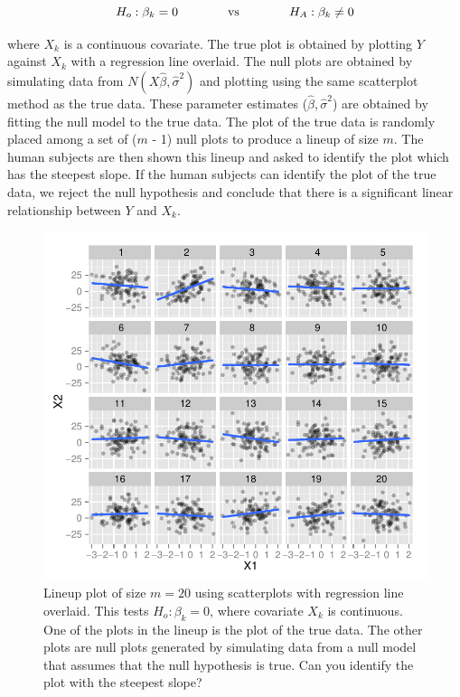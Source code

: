 \documentclass[12]{article}
\begin{document}
$$H_o : \beta_k = 0 \qquad \qquad \hbox{vs} \qquad \qquad H_A: \beta_k \ne 0$$

\noindent where $X_k$ is a continuous covariate. The true plot is obtained by plotting $Y$ against $X_k$ with a regression line overlaid. The null plots are obtained by simulating data from $N(X\hat{\beta}, \hat{\sigma}^2)$ and plotting using the same scatterplot method as the true data. These parameter estimates ($\hat{\beta}, \hat{\sigma}^2$) are obtained by fitting the null model to the true data. The plot of the true data is randomly placed among a set of ($m$ - 1) null plots to produce a lineup of size $m$. The human subjects are then shown this lineup and asked to identify the plot which has the steepest slope. If the human subjects can identify the plot of the true data, we reject the null hypothesis and conclude that there is a significant linear relationship between $Y$ and $X_k$. 

\begin{figure}[htbp]
\centerline{\includegraphics[width=1\textwidth]{lineup-protocol-example.pdf}}
\caption{Lineup plot of size $m = 20$ using scatterplots with regression line overlaid. This tests $H_o: \beta_k = 0$, where covariate $X_k$ is continuous. One of the plots in the lineup is the plot of the true data. The other plots are null plots generated by simulating data from a null model that assumes that the null hypothesis is true. Can you identify the plot with the steepest slope?  }
\label{lineup-example}
\end{figure}
\end{document}

